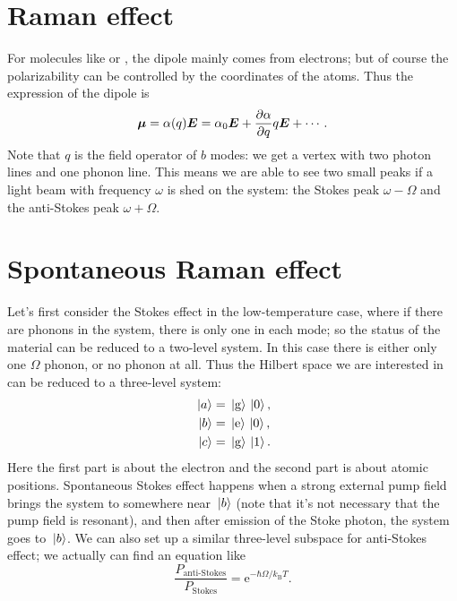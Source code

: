 \documentclass[hyperref, a4paper]{article}
\newcommand*{\ee}{\mathrm{e}}
\newcommand*{\kB}{k_{\text{B}}}
\begin{document}
\section{Raman effect}

For molecules like  or ,
the dipole mainly comes from electrons; 
but of course the polarizability can be controlled 
by the coordinates of the atoms.
Thus the expression of the dipole is 
\begin{equation}
    \vb*{\mu} = \alpha(q) \vb*{E} = 
    \alpha_0 \vb*{E} + \pdv{\alpha}{q} q \vb*{E} + \cdots.
\end{equation} 
Note that $q$ is the field operator of $b$ modes:
we get a vertex with two photon lines and one phonon line.
This means we are able to see two small peaks 
if a light beam with frequency $\omega$ is shed on the system:
the Stokes peak $\omega - \Omega$ 
and the anti-Stokes peak $\omega + \Omega$.

\section{Spontaneous Raman effect}

Let's first consider the Stokes effect in the low-temperature case, 
where if there are phonons in the system, 
there is only one in each mode; 
so the status of the material can be reduced to a two-level system.
In this case there is either only one $\Omega$ phonon, or no phonon at all.
Thus the Hilbert space we are interested in can be reduced to 
a three-level system:
\begin{equation}
    \begin{aligned}
        \ket*{a} &= \ket*{\text{g}} \ket*{0}, \\
        \ket*{b} &= \ket*{\text{e}} \ket*{0}, \\
        \ket*{c} &= \ket*{\text{g}} \ket*{1}.
    \end{aligned}
\end{equation}
Here the first part is about the electron 
and the second part is about atomic positions.
Spontaneous Stokes effect happens when a strong external pump field 
brings the system to somewhere near $\ket*{b}$ 
(note that it's not necessary that the pump field is resonant), 
and then after emission of the Stoke photon, 
the system goes to $\ket*{b}$.
We can also set up a similar three-level subspace for anti-Stokes effect; 
we actually can find an equation like 
\begin{equation}
    \frac{P_{\text{anti-Stokes}}}{P_{\text{Stokes}}} = \ee^{- \hbar \Omega / \kB T}.
\end{equation}
\end{document}
